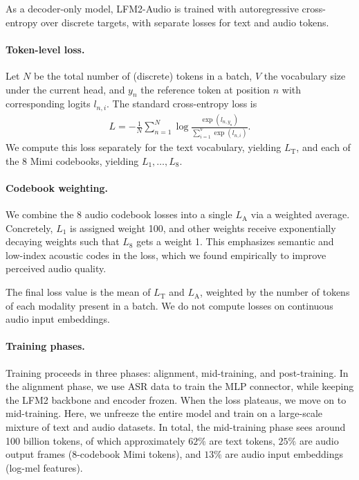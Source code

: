 \documentclass{article}
\begin{document}
As a decoder-only model, LFM2-Audio is trained with autoregressive cross-entropy over discrete targets, with separate losses for text and audio tokens.

\paragraph{Token-level loss.}
Let $N$ be the total number of (discrete) tokens in a batch, $V$ the vocabulary size under the current head, and $y_n$ the reference token at position $n$ with corresponding logits $l_{n,i}$. The standard cross-entropy loss is
\begin{align*}
L = -\frac{1}{N} \sum_{n=1}^N \log \frac{\exp(l_{n, y_n})}{\sum_{i=1}^V \exp(l_{n, i})}.
\end{align*}
We compute this loss separately for the text vocabulary, yielding $L_{\mathrm{T}}$, and each of the 8 Mimi codebooks, yielding $L_1,\dots,L_8$.

\paragraph{Codebook weighting.}
We combine the 8 audio codebook losses into a single $L_{\mathrm{A}}$ via a weighted average. Concretely, $L_1$ is assigned weight 100, and other weights receive exponentially decaying weights such that $L_8$ gets a weight 1. This emphasizes semantic and low-index acoustic codes in the loss, which we found empirically to improve perceived audio quality. 

The final loss value is the mean of $L_\mathrm{T}$ and $L_\mathrm{A}$, weighted by the number of tokens of each modality present in a batch. We do not compute losses on continuous audio input embeddings.


\paragraph{Training phases.}
Training proceeds in three phases: alignment, mid-training, and post-training. In the alignment phase, we use ASR data to train the MLP connector, while keeping the LFM2 backbone and encoder frozen. When the loss plateaus, we move on to mid-training. Here, we unfreeze the entire model and train on a large-scale mixture of text and audio datasets. In total, the mid-training phase sees around 100 billion tokens, of which approximately $62\%$ are text tokens, $25\%$ are audio output frames (8-codebook Mimi tokens), and $13\%$ are audio input embeddings (log-mel features).
\end{document}
